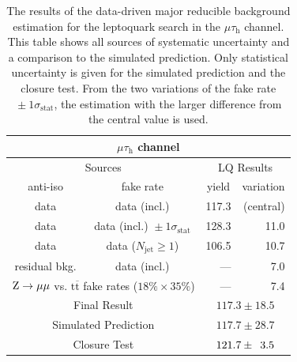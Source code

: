 \documentclass[12pt]{thesis}  %
\newcommand{\tauh}{\ensuremath{\tau_{\text{h}}}\xspace}
\newcommand{\mutau}{\ensuremath{\mu\tauh}\xspace}
\renewcommand{\ttbar}{\ensuremath{\mathrm{t}\overline{\mathrm{t}}}\xspace}
\newcommand{\ra}{\ensuremath{\rightarrow}}%
\newcommand{\Zmm}{\ensuremath{\Z \ra \mu\mu}\xspace}%
\begin{document}
\begin{table}[hbt]
  \begin{center}
    \begin{tabular}{|c|c|r|r|}
      \multicolumn{4}{c}{\mutau channel} \\
      \hline
      \multicolumn{2}{|c|}{Sources} & \multicolumn{2}{c|}{LQ Results} \\
      \hline
      anti-iso      & fake rate                                           & \multicolumn{1}{c|}{yield}  & \multicolumn{1}{c|}{variation}\\
      \hline
      data          & data (incl.)                                        & 117.3 & (central)\\
      data          & data (incl.) ${}\pm 1\sigma_{\text{stat}}$          & 128.3 & 11.0 \\
      data          & data ($N_{\text{jet}} \geq 1$)                      & 106.5 & 10.7    \\
      residual bkg. & data (incl.)                                        & ---   & 7.0     \\
      \multicolumn{2}{|c|}{\Zmm vs. \ttbar fake rates ($18\%\times35\%$)} & ---   & 7.4 \\
      \hline
      \multicolumn{2}{|c|}{Final Result}         & \multicolumn{2}{c|}{$117.3 \pm 18.5$}\\
      \multicolumn{2}{|c|}{Simulated Prediction} & \multicolumn{2}{c|}{$117.7 \pm 28.7$}\\
      \multicolumn{2}{|c|}{Closure Test}         & \multicolumn{2}{c|}{$121.7 \pm \hphantom{1}3.5$}\\
      \hline
    \end{tabular}
    \caption{The results of the data-driven major reducible background estimation for the leptoquark search in the \mutau channel. This table shows all sources of systematic uncertainty and a comparison to the simulated prediction. Only statistical uncertainty is given for the simulated prediction and the closure test. From the two variations of the fake rate ${}\pm 1\sigma_{\text{stat}}$, the estimation with the larger difference from the central value is used.}
    \label{Bkg:tab:faketauresultsmutauLQ}
  \end{center}
\end{table}
\end{document}
